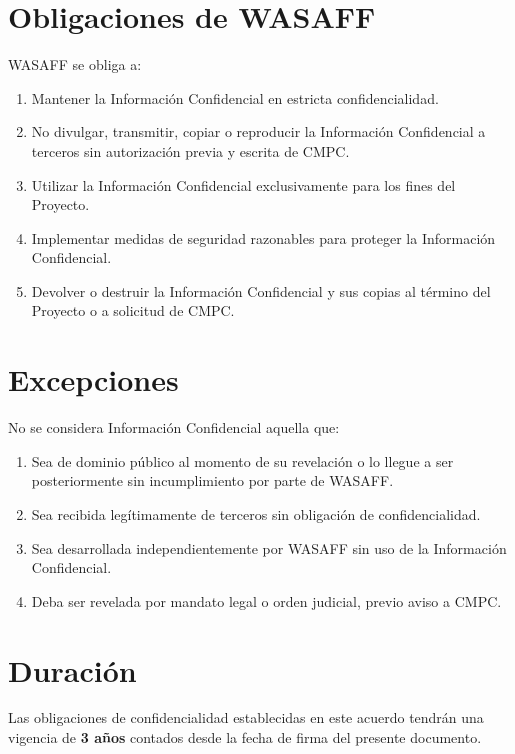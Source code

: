 \documentclass[11pt,a4paper]{article}
\begin{document}
\section*{Obligaciones de WASAFF}

WASAFF se obliga a:

\begin{enumerate}
  \item Mantener la Información Confidencial en estricta confidencialidad.
  \item No divulgar, transmitir, copiar o reproducir la Información Confidencial a terceros sin autorización previa y escrita de CMPC.
  \item Utilizar la Información Confidencial exclusivamente para los fines del Proyecto.
  \item Implementar medidas de seguridad razonables para proteger la Información Confidencial.
  \item Devolver o destruir la Información Confidencial y sus copias al término del Proyecto o a solicitud de CMPC.
\end{enumerate}

\section*{Excepciones}

No se considera Información Confidencial aquella que:

\begin{enumerate}
  \item Sea de dominio público al momento de su revelación o lo llegue a ser posteriormente sin incumplimiento por parte de WASAFF.
  \item Sea recibida legítimamente de terceros sin obligación de confidencialidad.
  \item Sea desarrollada independientemente por WASAFF sin uso de la Información Confidencial.
  \item Deba ser revelada por mandato legal o orden judicial, previo aviso a CMPC.
\end{enumerate}

\section*{Duración}

Las obligaciones de confidencialidad establecidas en este acuerdo tendrán una vigencia de \textbf{3 años} contados desde la fecha de firma del presente documento.
\end{document}
